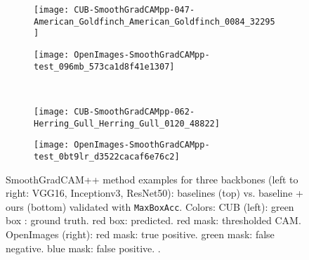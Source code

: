 \documentclass[twocolumn]{article}
\newcommand\maxboxacc{\texttt{MaxBoxAcc}\xspace}
\theoremstyle{definition}
\begin{document}
\begin{figure*}
     \begin{subfigure}[b]{0.49\textwidth}
         \centering
         \texttt{[image: CUB-SmoothGradCAMpp-047-American\_Goldfinch\_American\_Goldfinch\_0084\_32295]}
       \end{subfigure}
     \hfill
     \begin{subfigure}[b]{0.49\textwidth}
         \centering
         \texttt{[image: OpenImages-SmoothGradCAMpp-test\_096mb\_573ca1d8f41e1307]}
     \end{subfigure}
     \\
     \vspace{0.1cm}
     \begin{subfigure}[b]{0.49\textwidth}
         \centering
         \texttt{[image: CUB-SmoothGradCAMpp-062-Herring\_Gull\_Herring\_Gull\_0120\_48822]}
     \end{subfigure}
     \hfill
     \begin{subfigure}[b]{0.49\textwidth}
         \centering
         \texttt{[image: OpenImages-SmoothGradCAMpp-test\_0bt9lr\_d3522cacaf6e76c2]}
     \end{subfigure}
        \caption{SmoothGradCAM++ method examples for three backbones (left to right: VGG16, Inceptionv3, ResNet50): baselines (top) vs. baseline + ours (bottom)  validated with \maxboxacc. Colors: CUB (left): green box : ground truth. red box: predicted. red mask: thresholded CAM. OpenImages (right): red mask: true positive. green mask: false negative. blue mask: false positive. .}
        \label{fig:smoothgradcampp-cub-openim-example-pred}
\end{figure*}
\end{document}
